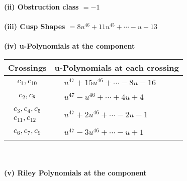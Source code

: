 \documentclass[1p]{elsarticle_modified}
\theoremstyle{definition}
\begin{document}
\flushleft \textbf{(ii) Obstruction class $= -1$}\\~\\
\flushleft \textbf{(iii) Cusp Shapes $= 8 u^{46}+11 u^{45}+\cdots- u-13$}\\~\\
\newpage\renewcommand{\arraystretch}{1}
\flushleft \textbf{(iv) u-Polynomials at the component}\newline \\
\begin{tabular}{m{50pt}|m{274pt}}
Crossings & \hspace{64pt}u-Polynomials at each crossing \\
\hline $$\begin{aligned}c_{1},c_{10}\end{aligned}$$&$\begin{aligned}
&u^{47}+15 u^{46}+\cdots-8 u-16
\end{aligned}$\\
\hline $$\begin{aligned}c_{2},c_{8}\end{aligned}$$&$\begin{aligned}
&u^{47}- u^{46}+\cdots+4 u+4
\end{aligned}$\\
\hline $$\begin{aligned}c_{3},c_{4},c_{5}\\c_{11},c_{12}\end{aligned}$$&$\begin{aligned}
&u^{47}+2 u^{46}+\cdots-2 u-1
\end{aligned}$\\
\hline $$\begin{aligned}c_{6},c_{7},c_{9}\end{aligned}$$&$\begin{aligned}
&u^{47}-3 u^{46}+\cdots- u+1
\end{aligned}$\\
\hline
\end{tabular}\\~\\
\newpage\renewcommand{\arraystretch}{1}
\flushleft \textbf{(v) Riley Polynomials at the component}\newline \\
\end{document}
